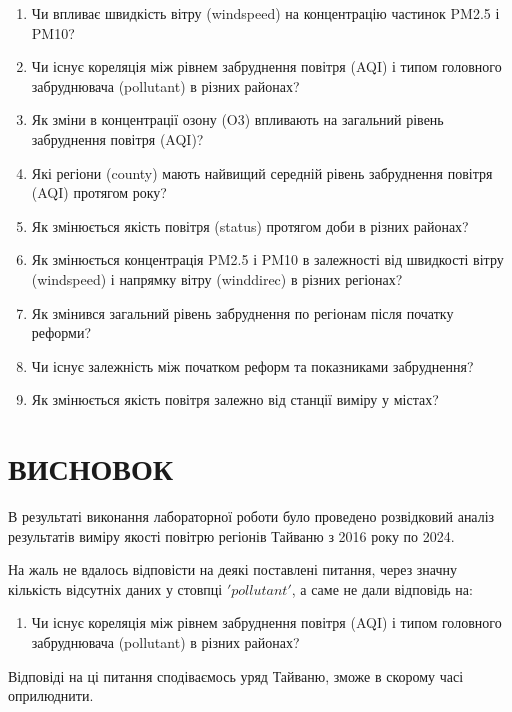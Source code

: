 \documentclass{article}
\begin{document}
\begin{enumerate}
    \item Чи впливає швидкість вітру (windspeed) на концентрацію частинок PM2.5 і PM10?
    \item  Чи існує кореляція між рівнем забруднення повітря (AQI) і типом головного забруднювача (pollutant) в різних районах?
    \item Як зміни в концентрації озону (O3) впливають на загальний рівень забруднення повітря (AQI)?
    \item Які регіони (county) мають найвищий середній рівень забруднення повітря (AQI) протягом року?
    \item Як змінюється якість повітря (status) протягом доби в різних районах?
    \item Як змінюється концентрація PM2.5 і PM10 в залежності від швидкості вітру (windspeed) і напрямку вітру (winddirec) в різних регіонах?
    \item Як змінився загальний рівень забруднення по регіонам після початку реформи? 
    \item Чи існує залежність між початком реформ та показниками забруднення? 
    \item Як змінюється якість повітря залежно від станції виміру у містах?
\end{enumerate}

    
\newpage



\pagebreak



\pagebreak

\newpage
\section{ВИСНОВОК}
В результаті виконання лабораторної роботи було проведено розвідковий аналіз результатів виміру якості повітрю регіонів Тайваню з 2016 року по 2024. 

На жаль не вдалось відповісти на деякі поставлені питання, через значну кількість відсутніх даних у стовпці $'pollutant'$, а саме не дали відповідь на: 
\begin{enumerate}
    
    \item  Чи існує кореляція між рівнем забруднення повітря (AQI) і типом головного забруднювача (pollutant) в різних районах?
    
\end{enumerate}
Відповіді на ці питання сподіваємось уряд Тайваню, зможе в скорому часі оприлюднити.
\end{document}
